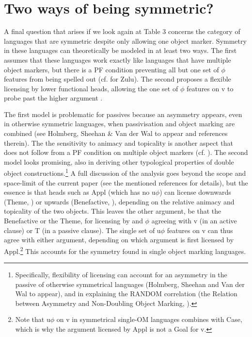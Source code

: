 \documentclass[output=paper
,modfonts
,nonflat]{langsci/langscibook}
\begin{document}
\section{Two ways of being symmetric?}

A final question that arises if we look again at Table 3 concerns the category of languages that are symmetric despite only allowing one object marker. Symmetry in these languages can theoretically be modeled in at least two ways. The first assumes that these languages work exactly like languages that have multiple object markers, but there is a PF condition preventing all but one set of $\phi$ features from being spelled out (cf. \citealt{Adams2010} for Zulu). The second proposes a flexible licensing by lower functional heads, allowing the one set of $\phi$ features on v to probe past the higher argument \citep{Haddican_Holmberg2012,Haddican_Holmberg2015,Van_der_Wal2017a,HolmbergEtAltoappear}. 

The first model is problematic for passives because an asymmetry appears, even in otherwise symmetric languages, when passivisation and object marking are combined (see Holmberg, Sheehan \& Van der Wal to appear and references therein). The the sensitivity to animacy and topicality is another aspect that does not follow from a PF condition on multiple object markers (cf. \citealt{Zeller2012}). The second model looks promising, also in deriving other typological properties of double object constructions.\footnote{Specifically, flexibility of licensing can account for an asymmetry in the passive of otherwise symmetrical languages (Holmberg, Sheehan and Van der Wal to appear), and in explaining the RANDOM correlation (the Relation between Asymmetry and Non-Doubling Object Marking, \citealt{Van_der_Wal2017b}).} A full discussion of the analysis goes beyond the scope and space-limit of the current paper (see the mentioned references for details), but the essence is that heads such as Appl (which has no u$\phi$) can license downwards (Theme, ) or upwards (Benefactive, ), depending on the relative animacy and topicality of the two objects. This leaves the other argument, be that the Benefactive or the Theme, for licensing by and $\phi$ agreeing with v (in an active clause) or T (in a passive clause). The single set of u$\phi$ features on v can thus agree with either argument, depending on which argument is first licensed by Appl.\footnote{Note that u$\phi$ on v in symmetrical single-OM languages combines with Case, which is why the argument licensed by Appl is not a Goal for v.} This accounts for the symmetry found in single object marking languages.
\end{document}
